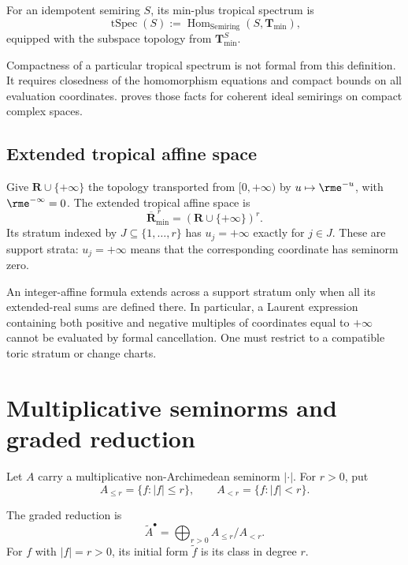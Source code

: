 \begin{definition}
\label{def:appG-tropical-spectrum}
For an idempotent semiring \(S\), its min-plus tropical spectrum is
\[
 \operatorname{tSpec}(S)
 :=
 \operatorname{Hom}_{\mathrm{Semiring}}(S,\mathbf T_{\min}),
\tag{G.10}\label{eq:appG-tropical-spectrum}
\]
equipped with the subspace topology from
\(\mathbf T_{\min}^{S}\).
\end{definition}

Compactness of a particular tropical spectrum is not formal from this
definition.
It requires closedness of the homomorphism equations and compact bounds on
all evaluation coordinates.
 proves those facts for coherent
ideal semirings on compact complex spaces.

\subsection{Extended tropical affine space}
\label{sec:appG-extended-affine}

Give \(\mathbf R\cup\{+\infty\}\) the topology transported from
\([0,+\infty)\) by \(u\mapsto \rme^{-u}\), with \(\rme^{-\infty}=0\).
The extended tropical affine space is
\[
                  \overline{\mathbf R}^{\,r}_{\min}
                  =(\mathbf R\cup\{+\infty\})^r.
\tag{G.11}\label{eq:appG-extended-affine}
\]
Its stratum indexed by \(J\subseteq\{1,\ldots,r\}\) has
\(u_j=+\infty\) exactly for \(j\in J\).
These are support strata: \(u_j=+\infty\) means that the corresponding
coordinate has seminorm zero.

An integer-affine formula extends across a support stratum only when all
its extended-real sums are defined there.
In particular, a Laurent expression containing both positive and negative
multiples of coordinates equal to \(+\infty\) cannot be evaluated by
formal cancellation.
One must restrict to a compatible toric stratum or change charts.

\section{Multiplicative seminorms and graded reduction}
\label{sec:appG-graded-reduction}

Let \(A\) carry a multiplicative non-Archimedean seminorm
\(|\cdot|\).
For \(r>0\), put
\[
 A_{\leq r}=\{f:|f|\leq r\},\qquad
 A_{<r}=\{f:|f|<r\}.
\tag{G.12}\label{eq:appG-norm-filtration}
\]

\begin{definition}
\label{def:appG-graded-reduction}
The graded reduction is
\[
 \widetilde A^\bullet
 =
 \bigoplus_{r>0}A_{\leq r}/A_{<r}.
\tag{G.13}\label{eq:appG-graded-reduction}
\]
For \(f\) with \(|f|=r>0\), its initial form
\(\widetilde f\) is its class in degree \(r\).
\end{definition}

